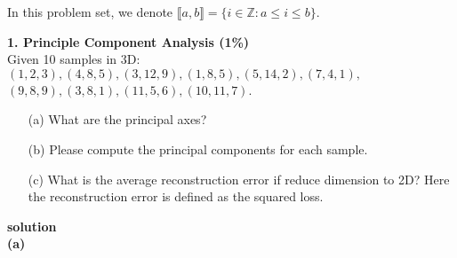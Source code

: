 \documentclass{article}
\begin{document}
In this problem set, we denote $\llbracket a, b \rrbracket = \{i \in {\mathbb Z} : a \le i \le b\}$.\\

\bigskip

\noindent
{\bf \Large 1. Principle Component Analysis (1\%)}\\

Given 10 samples in 3D: $(1, 2, 3), (4, 8, 5), (3, 12, 9), (1, 8, 5), (5, 14, 2),
(7, 4, 1),$\\
$(9, 8, 9), (3, 8, 1), (11, 5, 6), (10, 11, 7)$.\\

\begin{enumerate}
    \item[(a)] What are the principal axes?
    \item[(b)] Please compute the principal components for each sample.
    \item[(c)] What is the average reconstruction error if reduce dimension to 2D? Here the reconstruction error is defined as the squared loss.\\
\end{enumerate}

\noindent
{\bf \large solution}\\

\noindent
{\bf (a)}\\
\end{document}
